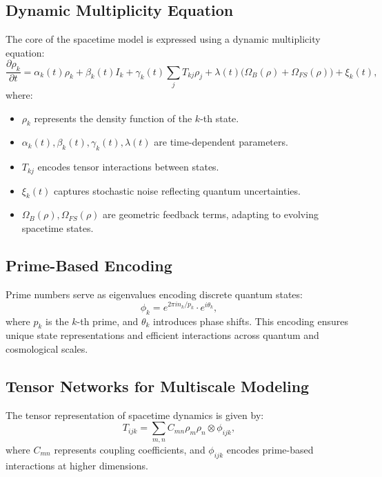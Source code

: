 \documentclass{article}
\theoremstyle{plain}
\begin{document}
\subsection{Dynamic Multiplicity Equation}
The core of the spacetime model is expressed using a dynamic multiplicity equation:
\begin{equation}
\frac{\partial \rho_k}{\partial t} = \alpha_k(t) \rho_k + \beta_k(t) I_k + \gamma_k(t) \sum_j T_{kj} \rho_j + \lambda(t) \big(\Omega_B(\rho) + \Omega_{FS}(\rho)\big) + \xi_k(t),
\end{equation}
where:
\begin{itemize}
    \item $\rho_k$ represents the density function of the $k$-th state.
    \item $\alpha_k(t), \beta_k(t), \gamma_k(t), \lambda(t)$ are time-dependent parameters.
    \item $T_{kj}$ encodes tensor interactions between states.
    \item $\xi_k(t)$ captures stochastic noise reflecting quantum uncertainties.
    \item $\Omega_B(\rho), \Omega_{FS}(\rho)$ are geometric feedback terms, adapting to evolving spacetime states.
\end{itemize}

\subsection{Prime-Based Encoding}
Prime numbers serve as eigenvalues encoding discrete quantum states:
\begin{equation}
\phi_k = e^{2\pi i n_k / p_k} \cdot e^{i\theta_k},
\end{equation}
where $p_k$ is the $k$-th prime, and $\theta_k$ introduces phase shifts. This encoding ensures unique state representations and efficient interactions across quantum and cosmological scales.

\subsection{Tensor Networks for Multiscale Modeling}
The tensor representation of spacetime dynamics is given by:
\begin{equation}
T_{ijk} = \sum_{m,n} C_{mn} \rho_m \rho_n \otimes \phi_{ijk},
\end{equation}
where $C_{mn}$ represents coupling coefficients, and $\phi_{ijk}$ encodes prime-based interactions at higher dimensions.
\end{document}
